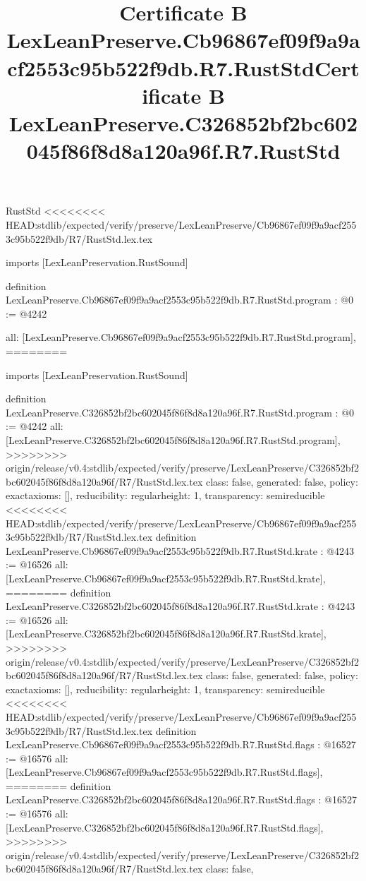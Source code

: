 \begin{lexlean}{RustStd}
<<<<<<<< HEAD:stdlib/expected/verify/preserve/LexLeanPreserve/Cb96867ef09f9a9acf2553c95b522f9db/R7/RustStd.lex.tex
\title{Certificate B LexLeanPreserve.Cb96867ef09f9a9acf2553c95b522f9db.R7.RustStd}
\begin{coremodule}
imports [LexLeanPreservation.RustSound]

definition LexLeanPreserve.Cb96867ef09f9a9acf2553c95b522f9db.R7.RustStd.program : @0 := @4242 {
  all: [LexLeanPreserve.Cb96867ef09f9a9acf2553c95b522f9db.R7.RustStd.program],
========
\title{Certificate B LexLeanPreserve.C326852bf2bc602045f86f8d8a120a96f.R7.RustStd}
\begin{coremodule}
imports [LexLeanPreservation.RustSound]

definition LexLeanPreserve.C326852bf2bc602045f86f8d8a120a96f.R7.RustStd.program : @0 := @4242 {
  all: [LexLeanPreserve.C326852bf2bc602045f86f8d8a120a96f.R7.RustStd.program],
>>>>>>>> origin/release/v0.4:stdlib/expected/verify/preserve/LexLeanPreserve/C326852bf2bc602045f86f8d8a120a96f/R7/RustStd.lex.tex
  class: false,
  generated: false,
  policy: exact{axioms: []},
  reducibility: regular{height: 1},
  transparency: semireducible
}
<<<<<<<< HEAD:stdlib/expected/verify/preserve/LexLeanPreserve/Cb96867ef09f9a9acf2553c95b522f9db/R7/RustStd.lex.tex
definition LexLeanPreserve.Cb96867ef09f9a9acf2553c95b522f9db.R7.RustStd.krate : @4243 := @16526 {
  all: [LexLeanPreserve.Cb96867ef09f9a9acf2553c95b522f9db.R7.RustStd.krate],
========
definition LexLeanPreserve.C326852bf2bc602045f86f8d8a120a96f.R7.RustStd.krate : @4243 := @16526 {
  all: [LexLeanPreserve.C326852bf2bc602045f86f8d8a120a96f.R7.RustStd.krate],
>>>>>>>> origin/release/v0.4:stdlib/expected/verify/preserve/LexLeanPreserve/C326852bf2bc602045f86f8d8a120a96f/R7/RustStd.lex.tex
  class: false,
  generated: false,
  policy: exact{axioms: []},
  reducibility: regular{height: 1},
  transparency: semireducible
}
<<<<<<<< HEAD:stdlib/expected/verify/preserve/LexLeanPreserve/Cb96867ef09f9a9acf2553c95b522f9db/R7/RustStd.lex.tex
definition LexLeanPreserve.Cb96867ef09f9a9acf2553c95b522f9db.R7.RustStd.flags : @16527 := @16576 {
  all: [LexLeanPreserve.Cb96867ef09f9a9acf2553c95b522f9db.R7.RustStd.flags],
========
definition LexLeanPreserve.C326852bf2bc602045f86f8d8a120a96f.R7.RustStd.flags : @16527 := @16576 {
  all: [LexLeanPreserve.C326852bf2bc602045f86f8d8a120a96f.R7.RustStd.flags],
>>>>>>>> origin/release/v0.4:stdlib/expected/verify/preserve/LexLeanPreserve/C326852bf2bc602045f86f8d8a120a96f/R7/RustStd.lex.tex
  class: false,
}}}
\end{coremodule}}
\end{coremodule}
\end{lexlean}
